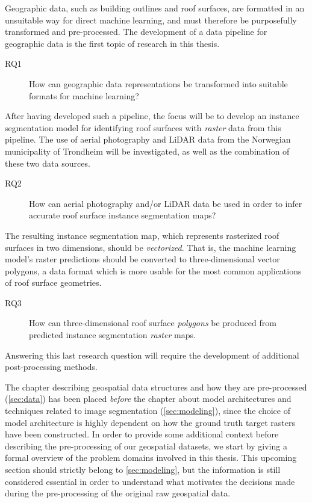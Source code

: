 Geographic data, such as building outlines and roof surfaces, are formatted in an unsuitable way for direct machine learning, and must therefore be purposefully transformed and pre-processed.
The development of a data pipeline for geographic data is the first topic of research in this thesis.
%
\begin{description}
  \item[RQ1] How can geographic data representations be transformed into suitable formats for machine learning?
\end{description}
%
After having developed such a pipeline, the focus will be to develop an instance segmentation model for identifying roof surfaces with \emph{raster} data from this pipeline.
The use of aerial photography and LiDAR data from the Norwegian municipality of Trondheim will be investigated, as well as the combination of these two data sources.
%
\begin{description}
  \item[RQ2] How can aerial photography and/or LiDAR data be used in order to infer accurate roof surface instance segmentation maps?
\end{description}
%
The resulting instance segmentation map, which represents rasterized roof surfaces in two dimensions, should be \emph{vectorized}.
That is, the machine learning model's raster predictions should be converted to three-dimensional vector polygons, a data format which is more usable for the most common applications of roof surface geometries.
%
\begin{description}
  \item[RQ3] How can three-dimensional roof surface \emph{polygons} be produced from predicted instance segmentation \emph{raster} maps.
\end{description}
%
Answering this last research question will require the development of additional post-processing methods.

The chapter describing geospatial data structures and how they are pre-\linebreak{}processed (\cref{sec:data}) has been placed \emph{before} the chapter about model architectures and techniques related to image segmentation (\cref{sec:modeling}), since the choice of model architecture is highly dependent on how the ground truth target rasters have been constructed.
In order to provide some additional context before describing the pre-processing of our geospatial datasets, we start by giving a formal overview of the problem domains involved in this thesis.
This upcoming section should strictly belong to \cref{sec:modeling}, but the information is still considered essential in order to understand what motivates the decisions made during the pre-processing of the original raw geospatial data.
